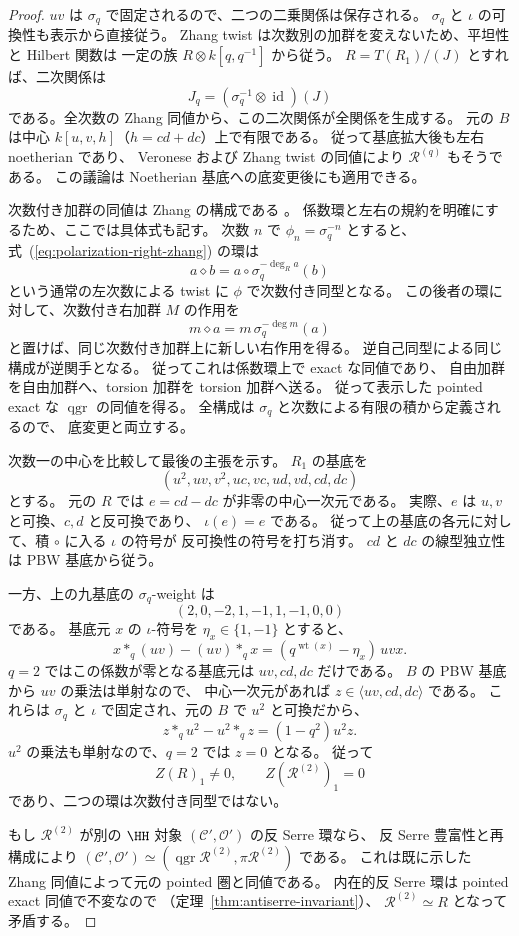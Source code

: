 \begin{proof}
$uv$ は $\sigma_q$ で固定されるので、二つの二乗関係は保存される。
$\sigma_q$ と $\iota$ の可換性も表示から直接従う。
Zhang twist は次数別の加群を変えないため、平坦性と Hilbert 関数は
一定の族 $R\otimes k[q,q^{-1}]$ から従う。
$R=T(R_1)/(J)$ とすれば、二次関係は
\[
 J_q=(\sigma_q^{-1}\otimes\operatorname{id})(J)
\]
である。全次数の Zhang 同値から、この二次関係が全関係を生成する。
元の $B$ は中心 $k[u,v,h]$（$h=cd+dc$）上で有限である。
従って基底拡大後も左右 noetherian であり、
Veronese および Zhang twist の同値により $\mathcal R^{(q)}$ もそうである。
この議論は Noetherian 基底への底変更後にも適用できる。

次数付き加群の同値は Zhang の構成である
\cite[Theorem 3.1]{Zhang1996}。
係数環と左右の規約を明確にするため、ここでは具体式も記す。
次数 $n$ で $\phi_n=\sigma_q^{-n}$ とすると、
式~(\ref{eq:polarization-right-zhang}) の環は
\[
 a\diamond b=a\mathbin{\circ}\sigma_q^{-\deg_R a}(b)
\]
という通常の左次数による twist に $\phi$ で次数付き同型となる。
この後者の環に対して、次数付き右加群 $M$ の作用を
\[
 m\diamond a=m\,\sigma_q^{-\deg m}(a)
\]
と置けば、同じ次数付き加群上に新しい右作用を得る。
逆自己同型による同じ構成が逆関手となる。
従ってこれは係数環上で exact な同値であり、
自由加群を自由加群へ、torsion 加群を torsion 加群へ送る。
従って表示した pointed exact な $\operatorname{qgr}$ の同値を得る。
全構成は $\sigma_q$ と次数による有限の積から定義されるので、
底変更と両立する。

次数一の中心を比較して最後の主張を示す。
$R_1$ の基底を
\[
 (u^2,uv,v^2,uc,vc,ud,vd,cd,dc)
 \tag{P-basis}\label{eq:polarization-generator-basis}
\]
とする。
元の $R$ では $e=cd-dc$ が非零の中心一次元である。
実際、$e$ は $u,v$ と可換、$c,d$ と反可換であり、
$\iota(e)=e$ である。
従って上の基底の各元に対して、積 $\circ$ に入る $\iota$ の符号が
反可換性の符号を打ち消す。
$cd$ と $dc$ の線型独立性は PBW 基底から従う。

一方、上の九基底の $\sigma_q$-weight は
\[
 (2,0,-2,1,-1,1,-1,0,0)
\]
である。
基底元 $x$ の $\iota$-符号を $\eta_x\in\{1,-1\}$ とすると、
\[
 x*_q(uv)-(uv)*_q x
 =(q^{\operatorname{wt}(x)}-\eta_x)\,uvx.
\]
$q=2$ ではこの係数が零となる基底元は $uv,cd,dc$ だけである。
$B$ の PBW 基底から $uv$ の乗法は単射なので、
中心一次元があれば $z\in\langle uv,cd,dc\rangle$ である。
これらは $\sigma_q$ と $\iota$ で固定され、元の $B$ で $u^2$ と可換だから、
\[
 z*_q u^2-u^2*_q z=(1-q^2)u^2z.
\]
$u^2$ の乗法も単射なので、$q=2$ では $z=0$ となる。
従って
\[
 Z(R)_1\ne0,\qquad Z(\mathcal R^{(2)})_1=0
\]
であり、二つの環は次数付き同型ではない。

もし $\mathcal R^{(2)}$ が別の $\HH$ 対象
$(\mathcal C',\mathcal O')$ の反 Serre 環なら、
反 Serre 豊富性と再構成により
$(\mathcal C',\mathcal O')\simeq
(\operatorname{qgr}\mathcal R^{(2)},\pi\mathcal R^{(2)})$ である。
これは既に示した Zhang 同値によって元の pointed 圏と同値である。
内在的反 Serre 環は pointed exact 同値で不変なので
（定理~\ref{thm:antiserre-invariant}）、
$\mathcal R^{(2)}\simeq R$ となって矛盾する。
\end{proof}

